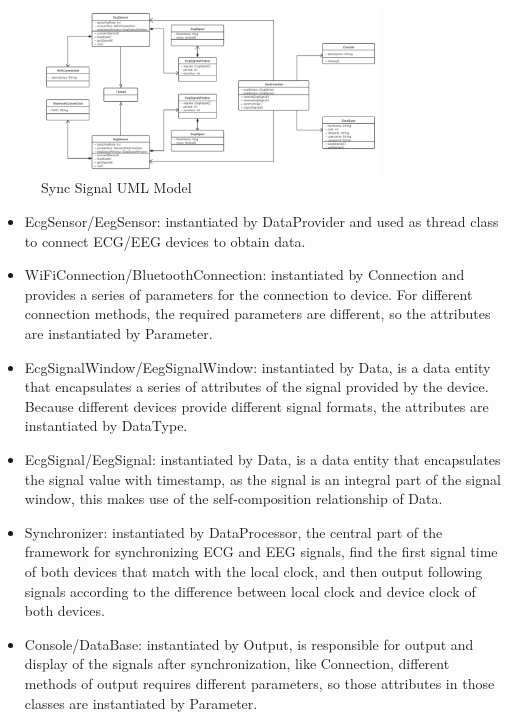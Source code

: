 \documentclass{article}
\begin{document}
\paragraph{}

\begin{figure}[htbp] 
\centering 
\includegraphics[width=0.8\textwidth]{Sync signal 5.3.png} 
\caption{Sync Signal UML Model} 
\label{Fig.main4} 
\end{figure}

\begin{itemize}
  \item EcgSensor/EegSensor: instantiated by DataProvider and used as thread class to connect ECG/EEG devices to obtain data.
  \item WiFiConnection/BluetoothConnection: instantiated by Connection and provides a series of parameters for the connection to device. For different connection methods, the required parameters are different, so the attributes are instantiated by Parameter.
  \item EcgSignalWindow/EegSignalWindow: instantiated by Data, is a data entity that encapsulates a series of attributes of the signal provided by the device. Because different devices provide different signal formats, the attributes are instantiated by DataType.
  \item EcgSignal/EegSignal: instantiated by Data, is a data entity that encapsulates the signal value with timestamp, as the signal is an integral part of the signal window, this makes use of the self-composition relationship of Data.
  \item Synchronizer: instantiated by DataProcessor, the central part of the framework for synchronizing ECG and EEG signals, find the first signal time of both devices that match with the local clock, and then output following signals according to the difference between local clock and device clock of both devices.
  \item Console/DataBase: instantiated by Output, is responsible for output and display of the signals after synchronization, like Connection, different methods of output requires different parameters, so those attributes in those classes are instantiated by Parameter.
\end{itemize}
\end{document}
